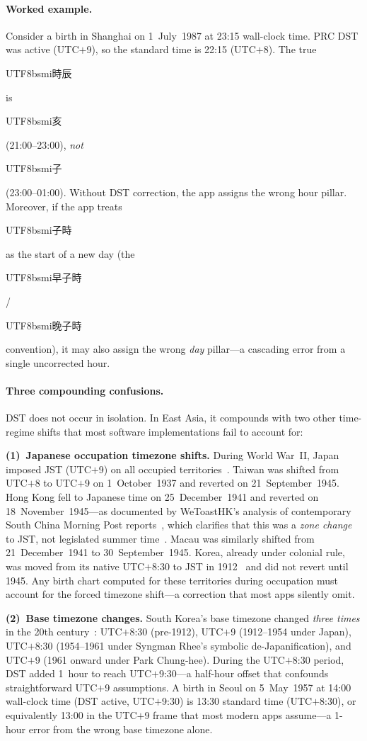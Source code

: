 \documentclass[10pt,a4paper]{article}
\newcommand{\zh}[1]{\begin{CJK}{UTF8}{bsmi}#1\end{CJK}}
\begin{document}
\paragraph{Worked example.}
Consider a birth in Shanghai on 1~July~1987 at 23:15 wall-clock time.  PRC
DST was active (UTC$+$9), so the standard time is 22:15 (UTC$+$8).  The
true \zh{時辰} is \zh{亥} (21:00--23:00), \emph{not} \zh{子}
(23:00--01:00).  Without DST correction, the app assigns the wrong hour
pillar.  Moreover, if the app treats \zh{子時} as the start of a new day
(the \zh{早子時}/\zh{晚子時} convention), it may also assign the wrong
\emph{day} pillar---a cascading error from a single uncorrected hour.

\paragraph{Three compounding confusions.}
DST does not occur in isolation.  In East Asia, it compounds with two
other time-regime shifts that most software implementations fail to account for:

\textbf{(1)~Japanese occupation timezone shifts.}
During World War~II, Japan imposed JST (UTC$+$9) on all occupied
territories~\cite{iana_tzdata_asia, china_timezone}.  Taiwan was shifted
from UTC$+$8 to UTC$+$9 on 1~October~1937 and reverted on
21~September~1945.  Hong Kong fell to Japanese time on
25~December~1941 and reverted on 18~November~1945---as documented by
WeToastHK's analysis of contemporary South China Morning Post
reports~\cite{wetoasthk_dst}, which clarifies that this was a
\emph{zone change} to JST, not legislated summer
time~\cite{hko_summertime}.  Macau was similarly shifted from
21~December~1941 to 30~September~1945.  Korea, already under colonial
rule, was moved from its native UTC$+$8:30 to JST in
1912~\cite{korea_tz_history} and did not revert until 1945.  Any birth
chart computed for these territories during occupation must account for
the forced timezone shift---a correction that most apps silently omit.

\textbf{(2)~Base timezone changes.}
South Korea's base timezone changed \emph{three times} in the 20th
century~\cite{korea_tz_history, iana_tzdata_asia}:
UTC$+$8:30 (pre-1912), UTC$+$9 (1912--1954 under Japan), UTC$+$8:30
(1954--1961 under Syngman Rhee's symbolic de-Japanification), and
UTC$+$9 (1961 onward under Park Chung-hee).  During the UTC$+$8:30
period, DST added 1~hour to reach UTC$+$9:30---a half-hour offset
that confounds straightforward UTC$+$9 assumptions.  A birth in Seoul on
5~May~1957 at 14:00 wall-clock time (DST active, UTC$+$9:30) is
13:30 standard time (UTC$+$8:30), or equivalently 13:00 in
the UTC$+$9 frame that most modern apps assume---a 1-hour error from
the wrong base timezone alone.
\end{document}
